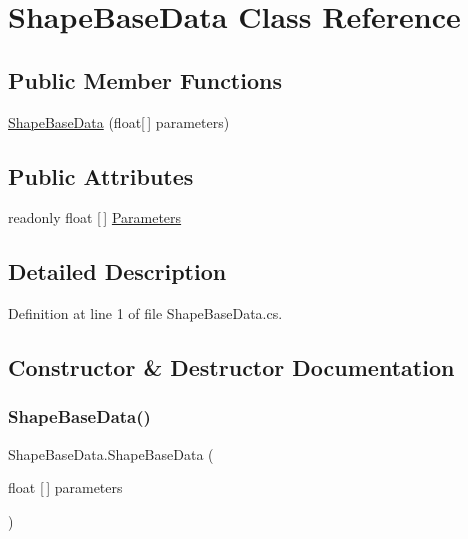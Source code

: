 \hypertarget{class_shape_base_data}{}\section{Shape\+Base\+Data Class Reference}
\label{class_shape_base_data}
\subsection*{Public Member Functions}
\begin{DoxyCompactItemize}
\item 
\mbox{\hyperlink{class_shape_base_data_ae357ef2e234f8aefe7c3ff2984e8c59c}{Shape\+Base\+Data}} (float\mbox{[}$\,$\mbox{]} parameters)
\end{DoxyCompactItemize}
\subsection*{Public Attributes}
\begin{DoxyCompactItemize}
\item 
readonly float \mbox{[}$\,$\mbox{]} \mbox{\hyperlink{class_shape_base_data_a263fe301ad336f18484de57a0a7361b0}{Parameters}}
\end{DoxyCompactItemize}


\subsection{Detailed Description}


Definition at line 1 of file Shape\+Base\+Data.\+cs.



\subsection{Constructor \& Destructor Documentation}
\mbox{\label{class_shape_base_data_ae357ef2e234f8aefe7c3ff2984e8c59c}} 
\subsubsection{\texorpdfstring{ShapeBaseData()}{ShapeBaseData()}}
{\footnotesize\ttfamily Shape\+Base\+Data.\+Shape\+Base\+Data (\begin{DoxyParamCaption}\item[{float \mbox{[}$\,$\mbox{]}}]{parameters }\end{DoxyParamCaption})}



